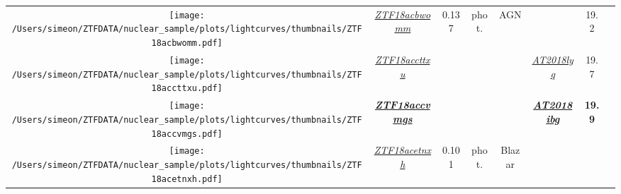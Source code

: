 \begin{table*}
{\begin{tabular}{c c  c  c  c   c  c  c}
      \parbox[c]{12em}{\texttt{[image: /Users/simeon/ZTFDATA/nuclear\_sample/plots/lightcurves/thumbnails/ZTF18acbwomm.pdf]}} & \textit{\href{https://ztfnuclear.simeonreusch.com/transient/ZTF18acbwomm}{ZTF18acbwomm}}
                                                                                                                                                  & 0.137                                                                                             & phot.          & AGN                     & ~                 & 19.2                       &                          \\
      \parbox[c]{12em}{\texttt{[image: /Users/simeon/ZTFDATA/nuclear\_sample/plots/lightcurves/thumbnails/ZTF18accttxu.pdf]}} & \textit{\href{https://ztfnuclear.simeonreusch.com/transient/ZTF18accttxu}{ZTF18accttxu}}          & ~              & ~                       & ~                 &
      \textit{\href{https://www.wis-tns.org/object/2018lyq}{AT2018lyq}}                                                                           & 19.7                                                                                              &                                                                                                                      \\
      \parbox[c]{12em}{\texttt{[image: /Users/simeon/ZTFDATA/nuclear\_sample/plots/lightcurves/thumbnails/ZTF18accvmgs.pdf]}} & \textbf{\textit{\href{https://ztfnuclear.simeonreusch.com/transient/ZTF18accvmgs}{ZTF18accvmgs}}} & ~              & ~                       & ~                 &
      \textbf{\textit{\href{https://www.wis-tns.org/object/2018ibg}{AT2018ibg}}}                                                                  & \textbf{19.9      }                                                                               &                                                                                                                      \\
      \parbox[c]{12em}{\texttt{[image: /Users/simeon/ZTFDATA/nuclear\_sample/plots/lightcurves/thumbnails/ZTF18acetnxh.pdf]}} & \textit{\href{https://ztfnuclear.simeonreusch.com/transient/ZTF18acetnxh}{ZTF18acetnxh}}
                                                                                                                                                  & 0.101                                                                                             & phot.          & Blazar                  &

\end{tabular}}
\end{table*}
